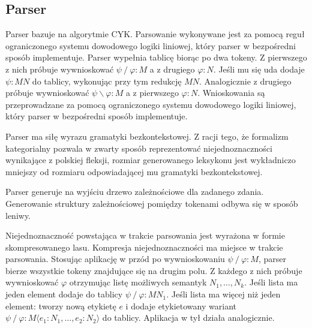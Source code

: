 \documentclass[oneside,pwrcover,withmarginpar,hidelinks,11pt]{article}
\newcommand{\forward}{\operatorname{/}}
\newcommand{\backward}{\operatorname{\backslash}}
\begin{document}
\subsection{Parser}
Parser bazuje na algorytmie CYK.
Parsowanie wykonywane jest za pomocą reguł ograniczonego systemu dowodowego logiki liniowej,
który parser w bezpośredni sposób implementuje.
Parser wypełnia tablicę biorąc po dwa tokeny.
Z pierwszego z nich próbuje wywnioskować $\psi\forward\varphi:M$ a z drugiego $\varphi:N$.
Jeśli mu się uda dodaje $\psi:MN$ do tablicy, wykonując przy tym redukcję $MN$.
Analogicznie z drugiego próbuje wywnioskować $\psi\backward\varphi:M$ a z pierwszego $\varphi:N$.
Wnioskowania są przeprowadzane za pomocą ograniczonego systemu dowodowego logiki liniowej,
który parser w bezpośredni sposób implementuje.

Parser ma siłę wyrazu gramatyki bezkontekstowej. Z racji tego, że
formalizm kategorialny pozwala w zwarty sposób reprezentować niejednoznaczności wynikające z polskiej fleksji,
rozmiar generowanego leksykonu jest wykładniczo mniejszy od rozmiaru odpowiadającej mu gramatyki bezkontekstowej.

Parser generuje na wyjściu drzewo zależnościowe dla zadanego zdania.
Generowanie struktury zależnościowej pomiędzy tokenami odbywa się w sposób leniwy. 

Niejednoznaczność powstająca w trakcie parsowania jest wyrażona w formie skompresowanego lasu.
Kompresja niejednoznaczności ma miejsce w trakcie parsowania.
Stosując aplikację w przód po wywnioskowaniu $\psi\forward\varphi:M$, parser bierze wszystkie tokeny 
znajdujące się na drugim polu.
Z każdego z nich próbuje wywnioskować $\varphi$ otrzymując listę możliwych semantyk $N_1,\dots,N_k$.
Jeśli lista ma jeden element dodaje do tablicy $\psi\forward\varphi:MN_1$.
Jeśli lista ma więcej niż jeden element: tworzy nową etykietę $e$ i 
dodaje etykietowany wariant $\psi\forward\varphi:M\langle e_1:N_1,\dots,e_2:N_2\rangle$ do tablicy.
Aplikacja w tył działa analogicznie.
\end{document}
